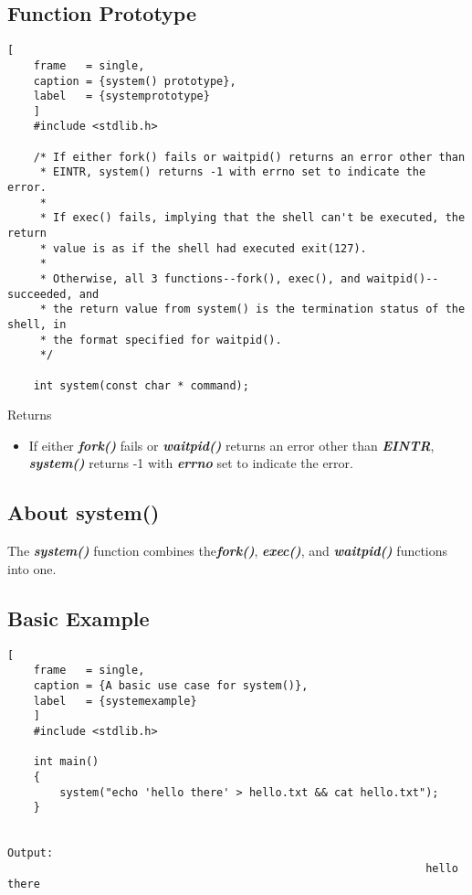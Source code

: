 \documentclass{article}
\newcommand\be[1]{\textbf{\emph{#1}}}
\begin{document}
\subsection{Function Prototype}
\begin{lstlisting}[
    frame   = single,
    caption = {system() prototype},
    label   = {systemprototype}
    ]
    #include <stdlib.h>

    /* If either fork() fails or waitpid() returns an error other than
     * EINTR, system() returns -1 with errno set to indicate the error.
     *
     * If exec() fails, implying that the shell can't be executed, the return 
     * value is as if the shell had executed exit(127).
     *
     * Otherwise, all 3 functions--fork(), exec(), and waitpid()--succeeded, and
     * the return value from system() is the termination status of the shell, in 
     * the format specified for waitpid().
     */

    int system(const char * command);
\end{lstlisting}
Returns 
\begin{itemize}
    \item If either \be{fork()} fails or \be{waitpid()} returns an error other than 
        \be{EINTR}, \be{system()} returns -1 with \be{errno} set to indicate the error.
\end{itemize}
\subsection{About system()}
The \be{system()} function combines the\be{fork()}, \be{exec()}, and \be{waitpid()} functions
into one.
\subsection{Basic Example}
\begin{lstlisting}[
    frame   = single,
    caption = {A basic use case for system()},
    label   = {systemexample}
    ]
    #include <stdlib.h>

    int main()
    {
        system("echo 'hello there' > hello.txt && cat hello.txt");
    }

                                                                Output:
                                                                hello there
\end{lstlisting}
\end{document}
